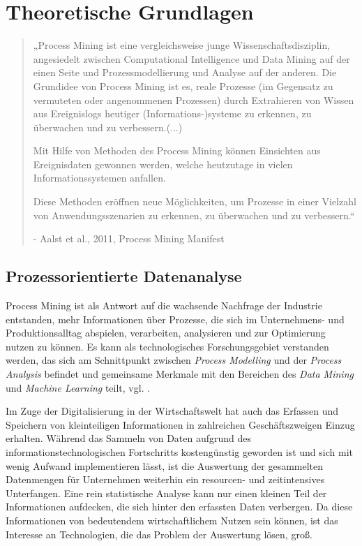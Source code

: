 \chapter{Theoretische Grundlagen}\label{chap:relatedwork}
\fontsize{11}{12}\selectfont\begin{quote}„Process Mining ist eine vergleichsweise junge Wissenschaftsdisziplin, angesiedelt zwischen Computational Intelligence und Data Mining auf der einen Seite und Prozessmodellierung und Analyse auf der anderen. Die Grundidee von Process Mining ist es, reale Prozesse (im Gegensatz zu vermuteten oder angenommenen Prozessen) durch Extrahieren von Wissen aus Ereignislogs heutiger (Informations-)systeme zu erkennen, zu überwachen und zu verbessern.(...) 

Mit Hilfe von Methoden des Process Mining können Einsichten aus Ereignisdaten gewonnen werden, welche heutzutage in vielen Informationssystemen anfallen. 

Diese Methoden eröffnen neue Möglichkeiten, um Prozesse in einer Vielzahl von Anwendungsszenarien zu erkennen, zu überwachen und zu verbessern.“

- Aalst et al., 2011, Process Mining Manifest \cite{PMManifesto}\end{quote}
\section{Prozessorientierte Datenanalyse}
Process Mining ist als Antwort auf die wachsende Nachfrage der Industrie entstanden, mehr Informationen über Prozesse, die sich im Unternehmens- und Produktionsalltag abspielen, verarbeiten, analysieren und zur Optimierung nutzen zu können. Es kann als technologisches Forschungsgebiet verstanden werden, das sich am Schnittpunkt zwischen \textit{Process Modelling} und der \textit{Process Analysis} befindet und gemeinsame Merkmale mit den Bereichen des \textit{Data Mining} und \textit{Machine Learning} teilt, vgl. \cite{Ailenei}.

Im Zuge der Digitalisierung in der Wirtschaftswelt hat auch das Erfassen und Speichern von kleinteiligen Informationen in zahlreichen Geschäftszweigen Einzug erhalten. Während das Sammeln von Daten aufgrund des informationstechnologischen Fortschritts kostengünstig geworden ist und sich mit wenig Aufwand implementieren lässt, ist die Auswertung der gesammelten Datenmengen für Unternehmen weiterhin ein resourcen- und zeitintensives Unterfangen. 
Eine rein statistische Analyse kann nur einen kleinen Teil der Informationen aufdecken, die sich hinter den erfassten Daten verbergen. Da diese Informationen von bedeutendem wirtschaftlichem Nutzen sein können, ist das Interesse an Technologien, die das Problem der Auswertung lösen, groß.

